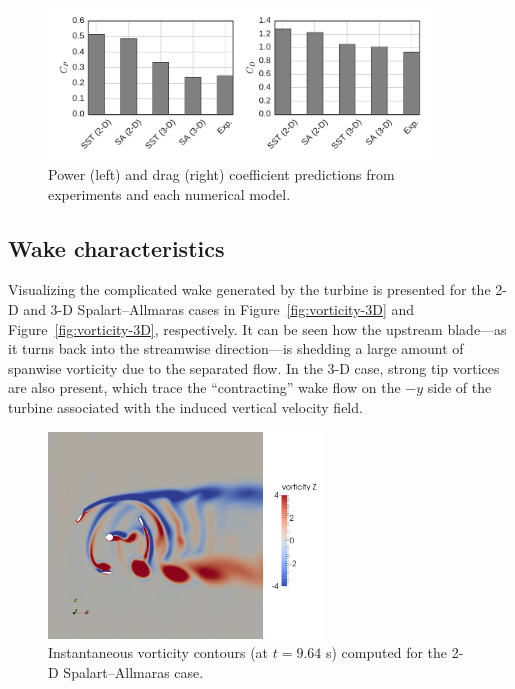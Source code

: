 \documentclass[aip,graphicx]{revtex4-1}
\begin{document}
\begin{figure}[ht]
    \centering

    \includegraphics[width=0.9\textwidth]{figures/perf_bar_chart}

    \caption{Power (left) and drag (right) coefficient predictions from
        experiments and each numerical model.}

    \label{fig:perf-comp}
\end{figure}


\subsection{Wake characteristics}

Visualizing the complicated wake generated by the turbine is presented for the
2-D and 3-D Spalart--Allmaras cases in Figure~\ref{fig:vorticity-3D} and
Figure~\ref{fig:vorticity-3D}, respectively. It can be seen how the upstream
blade---as it turns back into the streamwise direction---is shedding a large
amount of spanwise vorticity due to the separated flow. In the 3-D case, strong
tip vortices are also present, which trace the ``contracting'' wake flow on the
$-y$ side of the turbine associated with the induced vertical velocity field.

\begin{figure}
    \includegraphics[width=0.65\textwidth]{figures/2D_vorticity_SA_964}
    
    \caption{Instantaneous vorticity contours (at $t=9.64$ s) computed for the
        2-D Spalart--Allmaras case.}
    
    \label{fig:vorticity-2D}
\end{figure}
\end{document}
